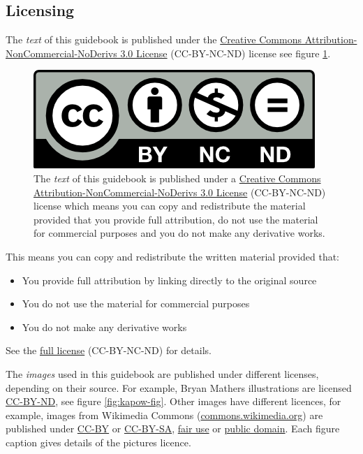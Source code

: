\documentclass[
]{book}
\providecommand{\tightlist}{%
  \setlength{\itemsep}{0pt}\setlength{\parskip}{0pt}}
\begin{document}
\hypertarget{license}{%
\subsection{Licensing}\label{license}}

The \emph{text} of this guidebook is published under the \href{https://creativecommons.org/licenses/by-nc-nd/3.0/}{Creative Commons Attribution-NonCommercial-NoDerivs 3.0 License} (CC-BY-NC-ND) license see figure \ref{fig:cc-by-nc-nd-fig}.

\begin{figure}

{\centering \includegraphics[width=1\linewidth]{images/by-nc-nd} 

}

\caption{The \emph{text} of this guidebook is published under a \href{https://creativecommons.org/licenses/by-nc-nd/3.0/}{Creative Commons Attribution-NonCommercial-NoDerivs 3.0 License} (CC-BY-NC-ND) license which means you can copy and redistribute the material provided that you provide full attribution, do not use the material for commercial purposes and you do not make any derivative works.}\label{fig:cc-by-nc-nd-fig}
\end{figure}



This means you can copy and redistribute the written material provided that:

\begin{itemize}
\tightlist
\item
  You provide full attribution by linking directly to the original source
\item
  You do not use the material for commercial purposes
\item
  You do not make any derivative works
\end{itemize}

See the \href{https://creativecommons.org/licenses/by-nc-nd/3.0/}{full license} (CC-BY-NC-ND) for details.

The \emph{images} used in this guidebook are published under different licenses, depending on their source. For example, Bryan Mathers illustrations are licensed \href{https://creativecommons.org/licenses/by-nd/4.0/}{CC-BY-ND}, see figure \ref{fig:kapow-fig}. Other images have different licences, for example, images from Wikimedia Commons (\href{https://commons.wikimedia.org/}{commons.wikimedia.org}) are published under \href{https://creativecommons.org/licenses/by/2.0/}{CC-BY} or \href{https://creativecommons.org/licenses/by-sa/2.0/}{CC-BY-SA}, \href{https://en.wikipedia.org/wiki/Fair_use}{fair use} or \href{https://en.wikipedia.org/wiki/Public_domain}{public domain}. Each figure caption gives details of the pictures licence.
\end{document}
